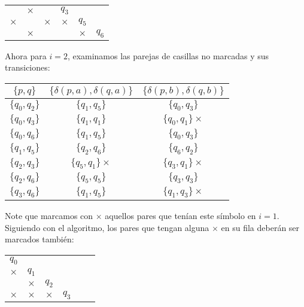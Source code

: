 \begin{itemize}
\begin{center}
\begin{tabular}{ cccccc}
        \multicolumn{1}{|c|}{} &\multicolumn{1}{|c|}{$\times$} &\multicolumn{1}{|c|}{} &$q_3$ & & \\ \cline{1-4}
        \multicolumn{1}{|c|}{$\times$} &\multicolumn{1}{|c|}{} &\multicolumn{1}{|c|}{$\times$} &\multicolumn{1}{|c|}{$\times$} &$q_5$ & \\ \cline{1-5}
        \multicolumn{1}{|c|}{} &\multicolumn{1}{|c|}{$\times$} &\multicolumn{1}{|c|}{} &\multicolumn{1}{|c|}{} &\multicolumn{1}{|c|}{$\times$} &$q_6$ \\ \cline{1-5}
    \end{tabular}
    \end{center}
    Ahora para $i=2$, examinamos las parejas de casillas no marcadas y sus transiciones:
    \begin{center}
        \begin{tabular}{c||c|c}
        $\{p,q\}$ & $\{\delta(p,a),\delta(q,a)\}$ & $\{\delta(p,b),\delta(q,b)\}$ \\ \hline
        $\{q_0,q_2\}$ & $\{q_1,q_5\}$ & $\{q_0,q_3\}$ \\ \hline
        $\{q_0,q_3\}$ & $\{q_1,q_1\}$ & $\{q_0,q_1\}\times$ \\ \hline
        $\{q_0,q_6\}$ & $\{q_1,q_5\}$ & $\{q_0,q_3\}$ \\ \hline
        $\{q_1,q_5\}$ & $\{q_2,q_6\}$ & $\{q_6,q_2\}$ \\ \hline
        $\{q_2,q_3\}$ & $\{q_5,q_1\}\times$ & $\{q_3,q_1\}\times$ \\ \hline
        $\{q_2,q_6\}$ & $\{q_5,q_5\}$  & $\{q_3,q_3\}$ \\ \hline
        $\{q_3,q_6\}$ & $\{q_1,q_5\}$ & $\{q_1,q_3\}\times$ \\ \hline   
        \end{tabular}
    \end{center}
    Note que marcamos con $\times$ aquellos pares que tenían este símbolo en $i=1.$ Siguiendo con el algoritmo, los pares que tengan alguna $\times$ en su fila deberán ser marcados también:
    \begin{center}
        \begin{tabular}{ cccccc}
        $q_0$& & & & & \\ \cline{1-1}
        \multicolumn{1}{|c|}{$\times$} &$q_1$ & & & & \\ \cline{1-2}
        \multicolumn{1}{|c|}{} &\multicolumn{1}{|c|}{$\times$} &$q_2$ & & & \\ \cline{1-3}
        \multicolumn{1}{|c|}{$\times$} &\multicolumn{1}{|c|}{$\times$} &\multicolumn{1}{|c|}{$\times$} &$q_3$ & & \\ \cline{1-4}

\end{tabular}
\end{center}
\end{itemize}
